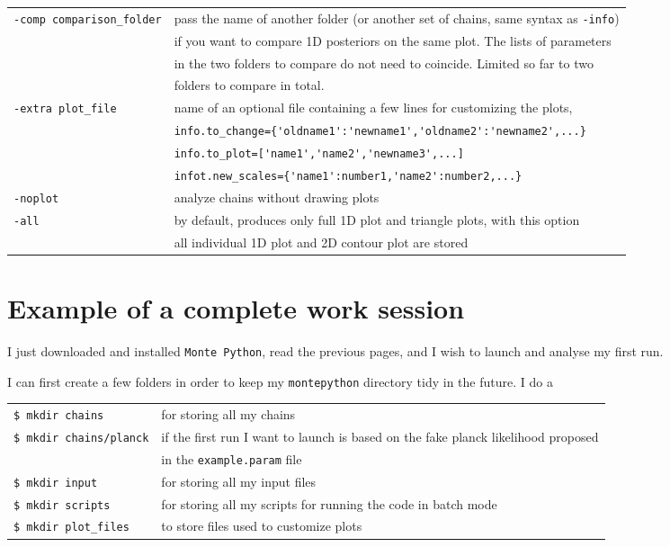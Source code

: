 \documentclass[10pt]{article}
\newcommand{\MP}{\texttt{Monte Python}}
\begin{document}
\begin{itemize}
\begin{tabular}{ll}
\verb?-comp comparison_folder? & pass the name of another folder (or another set of chains, same syntax as \verb?-info?)\\& if you want to compare 1D posteriors on the same plot. The lists of parameters\\& in the two folders to compare do not need to coincide. Limited so far to two \\&folders to compare in total.\\
\verb?-extra plot_file? & name of an optional file containing a few lines for customizing the plots,\\& \verb?info.to_change={'oldname1':'newname1','oldname2':'newname2',...}?\\&
\verb?info.to_plot=['name1','name2','newname3',...]?\\& 
\verb?infot.new_scales={'name1':number1,'name2':number2,...}?\\
\verb?-noplot? & analyze chains without drawing plots \\
\verb?-all? & by default, produces only full 1D plot and triangle plots, with this option\\& all individual 1D plot and 2D contour plot are stored 
\end{tabular}
\end{itemize}

\section{Example of a complete work session}

I just downloaded and installed \MP, read the previous pages, and I wish to launch and analyse my first run.

I can first create a few folders in order to keep my \verb?montepython? directory tidy in the future. I do a \\
\begin{tabular}{ll}
\verb?$ mkdir chains? &for storing all my chains\\
\verb?$ mkdir chains/planck?& if the first run I want to launch is based on the fake planck likelihood proposed\\& in the \verb?example.param? file\\
\verb?$ mkdir input?& for storing all my input files\\
\verb?$ mkdir scripts?& for storing all my scripts for running the code in batch mode\\
\verb?$ mkdir plot_files?&to store files used to customize plots
\end{tabular}\\
\end{document}
